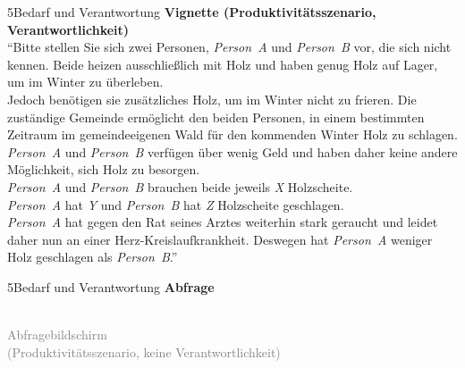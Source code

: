 \documentclass[xcolor=table,9pt,aspectratio=169]{beamer}
\begin{document}
\begin{frame}{\vspace*{10mm}5\hspace*{1em}Bedarf und Verantwortung}
\textbf{Vignette (Produktivitätsszenario, Verantwortlichkeit)}\\
\medskip
\enquote{Bitte stellen Sie sich zwei Personen, \textit{Person~A} und \textit{Person~B} vor, die sich nicht kennen. Beide heizen ausschließlich mit Holz und haben genug Holz auf Lager, um im Winter zu überleben.\\
\medskip
Jedoch benötigen sie zusätzliches Holz, um im Winter nicht zu frieren. Die zuständige Gemeinde ermöglicht den beiden Personen, in einem bestimmten Zeitraum im gemeindeeigenen Wald für den kommenden Winter Holz zu schlagen. \textit{Person~A} und \textit{Person~B} verfügen über wenig Geld und haben daher keine andere Möglichkeit, sich Holz zu besorgen.\\
\medskip
\textit{Person~A} und \textit{Person~B} brauchen beide jeweils \textit{X} Holzscheite.\\
\medskip
\textit{Person~A} hat \textit{Y} und \textit{Person~B} hat \textit{Z} Holzscheite geschlagen.\\
\medskip
\textit{Person~A} hat gegen den Rat seines Arztes weiterhin stark geraucht und leidet daher nun an einer Herz-Kreislaufkrankheit. Deswegen hat \textit{Person~A} weniger Holz geschlagen als \textit{Person~B}.}
\end{frame}


\begin{frame}{\vspace*{10mm}5\hspace*{1em}Bedarf und Verantwortung}
\textbf{Abfrage}\\
\bigskip
\begin{center}
   \\
   \footnotesize{\textcolor{gray}{Abfragebildschirm\\(Produktivitätsszenario, keine Verantwortlichkeit)}}
\end{center}
\end{frame}
\end{document}

